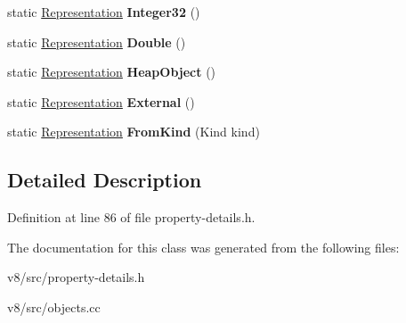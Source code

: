 \begin{DoxyCompactItemize}
static \mbox{\hyperlink{classv8_1_1internal_1_1Representation}{Representation}} {\bfseries Integer32} ()
\item 
\mbox{\label{classv8_1_1internal_1_1Representation_a2601764cfa13d6944d909d8c26fad1f3}} 
static \mbox{\hyperlink{classv8_1_1internal_1_1Representation}{Representation}} {\bfseries Double} ()
\item 
\mbox{\label{classv8_1_1internal_1_1Representation_aa620b108401d1d5396ca2cf81e85614f}} 
static \mbox{\hyperlink{classv8_1_1internal_1_1Representation}{Representation}} {\bfseries Heap\+Object} ()
\item 
\mbox{\label{classv8_1_1internal_1_1Representation_a58aecc078db837eced69a71cd9716360}} 
static \mbox{\hyperlink{classv8_1_1internal_1_1Representation}{Representation}} {\bfseries External} ()
\item 
\mbox{\label{classv8_1_1internal_1_1Representation_ae358bed6c0e672849eed8ae0dd4b1a7a}} 
static \mbox{\hyperlink{classv8_1_1internal_1_1Representation}{Representation}} {\bfseries From\+Kind} (Kind kind)
\end{DoxyCompactItemize}


\subsection{Detailed Description}


Definition at line 86 of file property-\/details.\+h.



The documentation for this class was generated from the following files\+:\begin{DoxyCompactItemize}
\item 
v8/src/property-\/details.\+h\item 
v8/src/objects.\+cc\end{DoxyCompactItemize}
